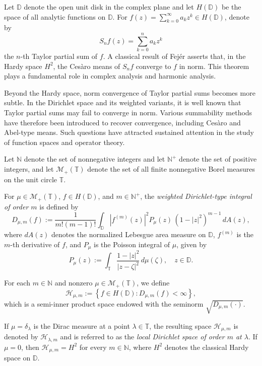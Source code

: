 \documentclass[12pt,reqno]{amsart}
\begin{document}
Let $\mathbb{D}$ denote the open unit disk in the complex plane and let $H(\mathbb{D})$ be the space of all analytic functions on $\mathbb{D}$.
For $f(z) = \sum_{k=0}^{\infty} a_k z^k \in H(\mathbb{D})$, denote by
\[
S_n f(z) = \sum_{k=0}^{n} a_k z^k
\]
the $n$-th Taylor partial sum of $f$.
A classical result of Fej\'er asserts that, in the Hardy space $H^2$, the Ces\`aro means of $S_n f$ converge to $f$ in norm.
This theorem plays a fundamental role in complex analysis and harmonic analysis.

Beyond the Hardy space, norm convergence of Taylor partial sums becomes more subtle.
In the Dirichlet space and its weighted variants, it is well known that Taylor partial sums may fail to converge in norm.
Various summability methods have therefore been introduced to recover convergence, including Ces\`aro and Abel-type means.
Such questions have attracted sustained attention in the study of function spaces and operator theory.

Let $\mathbb{N}$ denote the set of nonnegative integers and let $\mathbb{N}^+$ denote the set of positive integers, and let $\mathcal{M}_+(\mathbb{T})$ denote the set of all finite nonnegative Borel measures on the unit circle $\mathbb{T}$.

For $\mu \in \mathcal{M}_+(\mathbb{T})$, $f \in H(\mathbb{D})$, and $m \in \mathbb{N}^+$, the \emph{weighted Dirichlet-type integral of order $m$} is defined by
\[
D_{\mu,m}(f)
:= \frac{1}{m!(m - 1)!}
\int_{\mathbb{D}} \left| f^{(m)}(z) \right|^2 P_\mu(z)\,(1 - |z|^2)^{m - 1} \, dA(z),
\]
where $dA(z)$ denotes the normalized Lebesgue area measure on $\mathbb{D}$, $f^{(m)}$ is the $m$-th derivative of $f$, and $P_\mu$ is the Poisson integral of $\mu$, given by
\[
P_\mu(z) := \int_{\mathbb{T}} \frac{1 - |z|^2}{|z - \zeta|^2} \, d\mu(\zeta),
\quad z \in \mathbb{D}.
\]

For each $m \in \mathbb{N}$ and nonzero $\mu \in \mathcal{M}_+(\mathbb{T})$, we define
\[
\mathcal{H}_{\mu,m}
:= \left\{ f \in H(\mathbb{D}) : D_{\mu,m}(f) < \infty \right\},
\]
which is a semi-inner product space endowed with the seminorm $\sqrt{D_{\mu,m}(\cdot)}$.

If $\mu = \delta_\lambda$ is the Dirac measure at a point $\lambda \in \mathbb{T}$, the resulting space $\mathcal{H}_{\mu,m}$ is denoted by $\mathcal{H}_{\lambda,m}$ and is referred to as the \emph{local Dirichlet space of order $m$ at $\lambda$}.
If $\mu = 0$, then $\mathcal{H}_{\mu,m} = H^2$ for every $m \in \mathbb{N}$, where $H^2$ denotes the classical Hardy space on $\mathbb{D}$.
\end{document}

